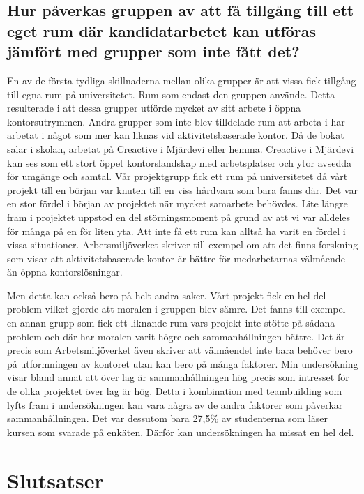 \subsection{Hur påverkas gruppen av att få tillgång till ett eget rum där kandidatarbetet kan utföras jämfört med grupper som inte fått det?}
En av de första tydliga skillnaderna mellan olika grupper är att vissa fick tillgång till egna rum på universitetet. Rum som endast den gruppen använde. Detta resulterade i att dessa grupper utförde mycket av sitt arbete i öppna kontorsutrymmen. Andra grupper som inte blev tilldelade rum att arbeta i har arbetat i något som mer kan liknas vid aktivitetsbaserade kontor. Då de bokat salar i skolan, arbetat på Creactive i Mjärdevi eller hemma. Creactive i Mjärdevi kan ses som ett stort öppet kontorslandskap med arbetsplatser och ytor avsedda för umgänge och samtal. Vår projektgrupp fick ett rum på universitetet då vårt projekt till en början var knuten till en viss hårdvara som bara fanns där. Det var en stor fördel i början av projektet när mycket samarbete behövdes. Lite längre fram i projektet uppstod en del störningsmoment på grund av att vi var alldeles för många på en för liten yta. Att inte få ett rum kan alltså ha varit en fördel i vissa situationer. Arbetsmiljöverket skriver till exempel om att det finns forskning som visar att aktivitetsbaserade kontor är bättre för medarbetarnas välmående än öppna kontorslösningar. 

Men detta kan också bero på helt andra saker. Vårt projekt fick en hel del problem vilket gjorde att moralen i gruppen blev sämre. Det fanns till exempel en annan grupp som fick ett liknande rum vars projekt inte stötte på sådana problem och där har moralen varit högre och sammanhållningen bättre. Det är precis som Arbetsmiljöverket även skriver att välmåendet inte bara behöver bero på utformningen av kontoret utan kan bero på många faktorer. Min undersökning visar bland annat att över lag är sammanhållningen hög precis som intresset för de olika projektet över lag är hög. Detta i kombination med teambuilding som lyfts fram i undersökningen kan vara några av de andra faktorer som påverkar sammanhållningen. Det var dessutom bara 27,5\% av studenterna som läser kursen som svarade på enkäten. Därför kan undersökningen ha missat en hel del.

\section{Slutsatser}
\label{sec:conclusions-hampus}

